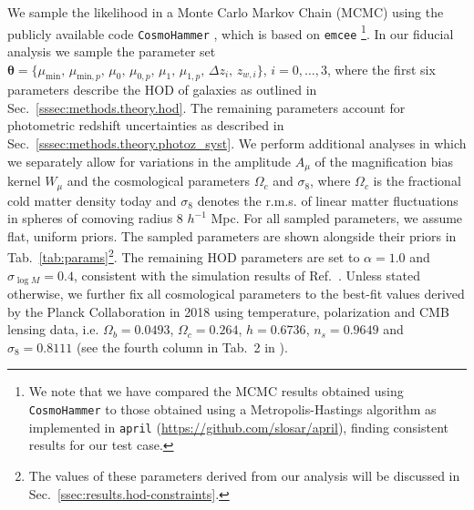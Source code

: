 \documentclass[a4paper,11pt]{article}
\begin{document}
    We sample the likelihood in a Monte Carlo Markov Chain (MCMC) using the publicly available code \texttt{CosmoHammer} \cite{Akeret:2013}, which is based on \texttt{emcee} \cite{Foreman-Mackey2013}\footnote{We note that we have compared the MCMC results obtained using \texttt{CosmoHammer} to those obtained using a Metropolis-Hastings algorithm as implemented in \texttt{april} (\url{https://github.com/slosar/april}), finding consistent results for our test case.}. In our fiducial analysis we sample the parameter set $\boldsymbol{\theta} = \{\mu_{\mathrm{min}}, \allowbreak \, \mu_{\mathrm{min}, p}, \allowbreak \, \mu_{0}, \allowbreak \, \mu_{0, p}, \allowbreak \, \mu_{1}, \allowbreak \, \mu_{1, p}, \allowbreak \, \Delta z_{i}, \allowbreak \, z_{w, i}\}$, $i = 0, \dots ,3$, where the first six parameters describe the HOD of galaxies as outlined in Sec.~\ref{sssec:methods.theory.hod}. The remaining parameters account for photometric redshift uncertainties as described in Sec.~\ref{sssec:methods.theory.photoz_syst}. We perform additional analyses in which we separately allow for variations in the amplitude $A_{\mu}$ of the magnification bias kernel $W_{\mu}$ and the cosmological parameters $\Omega_{c}$ and $\sigma_{8}$, where $\Omega_{c}$ is the fractional cold matter density today and $\sigma_{8}$ denotes the r.m.s. of linear matter fluctuations in spheres of comoving radius 8 $h^{-1}$ Mpc. For all sampled parameters, we assume flat, uniform priors. The sampled parameters are shown alongside their priors in Tab.~\ref{tab:params}\footnote{The values of these parameters derived from our analysis will be discussed in Sec.~\ref{ssec:results.hod-constraints}.}. The remaining HOD parameters are set to $\alpha = 1.0$ and $\sigma_{\log M} = 0.4$, consistent with the simulation results of Ref.~\cite{2005ApJ...633..791Z}. Unless stated otherwise, we further fix all cosmological parameters to the best-fit values derived by the Planck Collaboration in 2018 using temperature, polarization and CMB lensing data, i.e. $\Omega_{b}=0.0493$, $\Omega_{c}=0.264$, $h=0.6736$, $n_{s}=0.9649$ and $\sigma_{8}=0.8111$ (see the fourth column in Tab.~2 in \cite{Planck:2018}).
    
\end{document}
